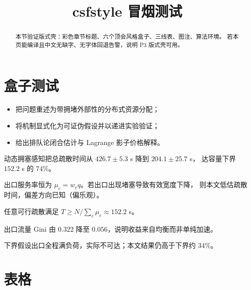 \documentclass[withoutpreface,bwprint]{cumcmthesis}
\title{csfstyle 冒烟测试}
\begin{document}
\maketitle

\begin{abstract}
本节验证版式壳：彩色章节标题、六个顶会风格盒子、三线表、图注、算法环境。
若本页能编译且中文无缺字、无字体回退告警，说明 P3 版式壳可用。
\end{abstract}

\section{盒子测试}

\begin{csfcontrib}
\begin{itemize}
  \item 把问题重述为带拥堵外部性的分布式资源分配；
  \item 将机制显式化为可证伪假设并以递进实验验证；
  \item 给出排队论闭合估计与 Lagrange 影子价格解释。
\end{itemize}
\end{csfcontrib}

\begin{csfkey}
动态拥塞感知把总疏散时间从 $426.7\pm5.3$ s 降到 $204.1\pm25.7$ s，
达容量下界 $152.2$ s 的 $74\%$。
\end{csfkey}

\begin{csfasm}
出口服务率恒为 $\mu_e=w_e q$。若出口出现堵塞导致有效宽度下降，
则本文低估疏散时间，偏差方向已知（偏乐观）。
\end{csfasm}

\begin{csfprop}[命题 1（容量下界）]
任意可行疏散满足 $T\ge N/\sum_e\mu_e\approx152.2$ s。
\end{csfprop}

\begin{csftake}
出口流量 Gini 由 $0.322$ 降至 $0.056$，说明收益来自均衡而非单纯加速。
\end{csftake}

\begin{csflimit}
下界假设出口全程满负荷，实际不可达；本文结果仍高于下界约 $34\%$。
\end{csflimit}

\section{表格}
\end{document}
